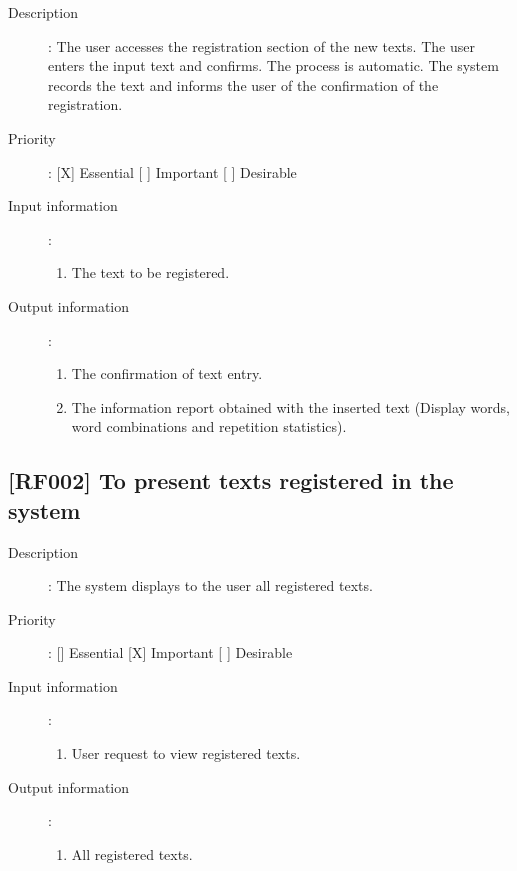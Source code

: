 \documentclass[11pt, twoside, a4paper]{book}
\begin{document}
				\begin{description}
				
					\item[Description]: The user accesses the registration section of the new texts. The user enters the input text and confirms. The process is automatic. The system records the text and informs the user of the confirmation of the registration.	
					\item[Priority]: [X] Essential [ ] Important [ ] Desirable
					\item[Input information]:
						\begin{enumerate}
						
							\item The text to be registered.
							
						\end{enumerate}
					\item[Output information]:
						\begin{enumerate}
						
							\item The confirmation of text entry.
							\item The information report obtained with the inserted text (Display words, word combinations and repetition statistics).
														
						\end{enumerate}
	
				\end{description}

			\subsection{[RF002] To present texts registered in the system}
				
				\begin{description}
				
					\item[Description]: The system displays to the user all registered texts.	
					\item[Priority]: [] Essential [X] Important [ ] Desirable
					\item[Input information]:
						\begin{enumerate}

							\item User request to view registered texts.
							
						\end{enumerate}
					\item[Output information]:
						\begin{enumerate}
						
							\item All registered texts.
														
						\end{enumerate}
	
				\end{description}
\end{document}
